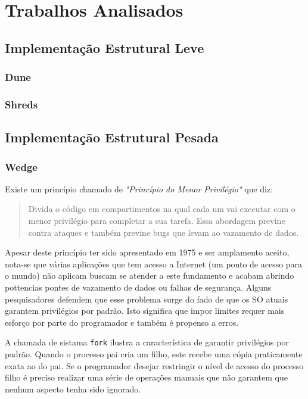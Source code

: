 \chapter{Trabalhos Analisados}
\label{cap:trabalhos-analisados}

\section{Implementação Estrutural Leve}

\subsection{Dune}

\subsection{Shreds}

\section{Implementação Estrutural Pesada}

\subsection{Wedge}

Existe um princípio chamado de \emph{"Princípio do Menor Privilégio"} que diz:

\begin{quote}
Divida o código em compartimentos na qual cada um vai executar com o menor
privilégio para completar a sua tarefa. Essa abordagem previne contra ataques
e também previne bugs que levam ao vazamento de dados.
\citep{protectionprinciple}
\end{quote}

Apesar deste princípio ter sido apresentado em 1975 e ser amplamento aceito,
nota-se que várias aplicações que tem acesso a Internet (um ponto de acesso
para o mundo) não aplicam buscam se atender a este fundamento e acabam abrindo
pottencias pontes de vazamento de dados ou falhas de segurança. Alguns
pesquisadores defendem que esse problema surge do fado de que os SO atuais
garantem privilégios por padrão. Isto significa que impor limites requer mais
esforço por parte do programador e também é propenso a erros.

A chamada de sistama \texttt{fork} ilustra a característica de garantir
privilégios por padrão. Quando o processo pai cria um filho, este recebe uma
cópia praticamente exata ao do pai. Se o programador desejar restringir o
nível de acesso do processo filho é preciso realizar uma série de operações
manuais que não garantem que nenhum aspecto tenha sido ignorado.

